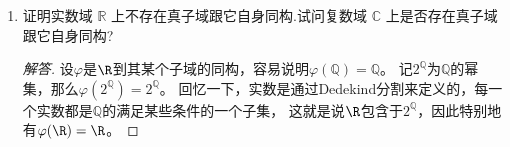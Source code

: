 \begin{enumerate}
\begin{proof}[解答]
\begin{enumerate}[label=(\arabic*)]
    就是$\begin{pmatrix}a&b\\ \\-b&a\end{pmatrix}$，即
    \[(a+bx)\begin{pmatrix}1\\ \\x\end{pmatrix}
    =\begin{pmatrix}a&b\\ \\-b&a\end{pmatrix}\begin{pmatrix}1\\ \\x\end{pmatrix},\]
    可知$\varphi$也是乘法同态。因此$\varphi$是环同构，
    从而$\left\{\begin{pmatrix}a&b\\ \\-b&a\end{pmatrix}\,\middle|\,a,b \in F\right\}$
    是域当且仅当$F[x]/(x^2+1)$是域，由第二章推论5.12，这等价于$x^2+1$是$F[x]$中的不可约多项式。
    \item $\left\{\begin{pmatrix}a&0\\ \\0&a\end{pmatrix}\,\middle|\,a \in F\right\}$是同构于$F$的子域。
    \item 方程$x^2+1=0$在$\mathbb{F}_3$中无解，从而
    $\left\{\begin{pmatrix}a&b\\ \\-b&a\end{pmatrix}\,\middle|\,a,b\in\mathbb{F}_3\right\}$
    是有$9$个元素的域，其特征为$3$。\qedhere
    \end{enumerate}
\end{proof}

    \item 证明实数域 $ \mathbb{R} $ 上不存在真子域跟它自身同构.试问复数域 $ \mathbb{C} $ 上是否存在真子域跟它自身同构?
\begin{proof}[解答]
    设$\varphi$是$\R$到其某个子域的同构，容易说明$\varphi(\mathbb{Q})=\mathbb{Q}$。
    记$2^\mathbb{Q}$为$\mathbb{Q}$的幂集，那么$\varphi(2^\mathbb{Q})=2^\mathbb{Q}$。
    回忆一下，实数是通过Dedekind分割来定义的，每一个实数都是$\mathbb{Q}$的满足某些条件的一个子集，
    这就是说$\R$包含于$2^\mathbb{Q}$，因此特别地有$\varphi(\R)=\R$。


\end{proof}
\end{enumerate}
